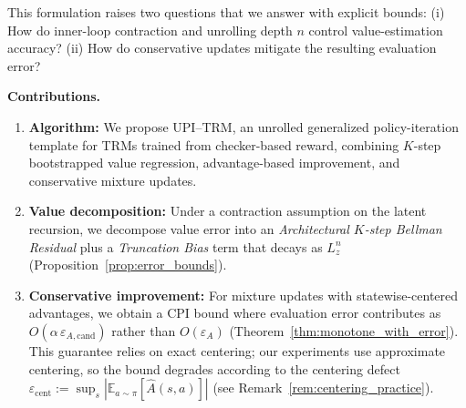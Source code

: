 \documentclass{article}
\theoremstyle{plain}
\theoremstyle{definition}
\theoremstyle{remark}
\newcommand{\E}{\mathbb{E}}
\begin{document}
This formulation raises two questions that we answer with explicit bounds: (i) How do inner-loop contraction and unrolling depth $n$ control value-estimation accuracy? (ii) How do conservative updates mitigate the resulting evaluation error?

\textbf{Contributions.}
\begin{enumerate}
\item \textbf{Algorithm:} We propose UPI--TRM, an unrolled generalized policy-iteration template for TRMs trained from checker-based reward, combining $K$-step bootstrapped value regression, advantage-based improvement, and conservative mixture updates.
\item \textbf{Value decomposition:} Under a contraction assumption on the latent recursion, we decompose value error into an \emph{Architectural $K$-step Bellman Residual} plus a \emph{Truncation Bias} term that decays as $L_z^n$ (Proposition~\ref{prop:error_bounds}).
\item \textbf{Conservative improvement:} For mixture updates with statewise-centered advantages, we obtain a CPI bound where evaluation error contributes as $O(\alpha\,\varepsilon_{A,\mathrm{cand}})$ rather than $O(\varepsilon_A)$ (Theorem~\ref{thm:monotone_with_error}). This guarantee relies on exact centering; our experiments use approximate centering, so the bound degrades according to the centering defect $\varepsilon_{\mathrm{cent}}:=\sup_s|\E_{a\sim\pi}[\widehat A(s,a)]|$ (see Remark~\ref{rem:centering_practice}).
\end{enumerate}

\end{document}
